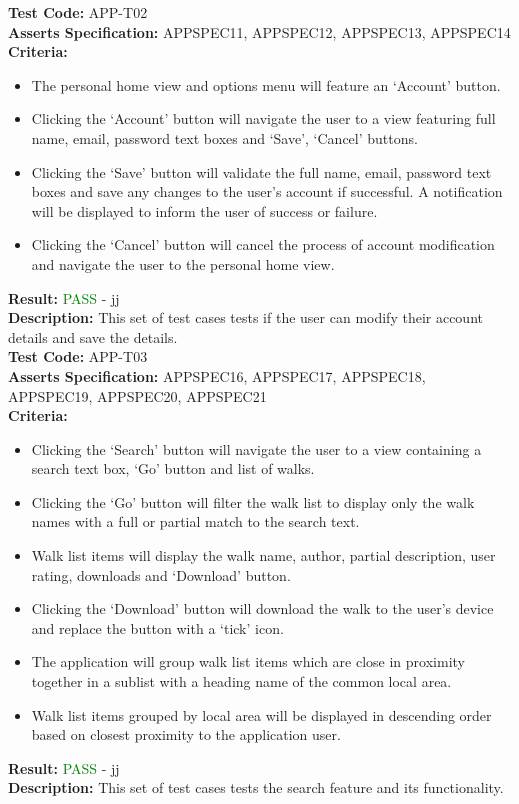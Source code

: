 \documentclass[11pt,a4paper]{report}
\begin{document}
\label{test:APP-T02}
\noindent\textbf{Test Code:} APP-T02\\
\textbf{Asserts Specification:} APPSPEC11, APPSPEC12, APPSPEC13, APPSPEC14\\ 
\textbf{Criteria:} \begin{itemize}
                     \item The personal home view and options menu will feature an `Account' button.
                     \item Clicking the `Account' button will navigate the user to a view featuring full name, email, password text boxes and `Save', `Cancel' buttons.
                     \item Clicking the `Save' button will validate the full name, email, password text boxes and save any changes to the user's account if successful. A notification will be displayed to inform the user of success or failure.
                     \item Clicking the `Cancel' button will cancel the process of account modification and navigate the user to the personal home view. 
                   \end{itemize}
\textbf{Result:} \textcolor{green}{PASS} - jj\\
\textbf{Description:} This set of test cases tests if the user can modify their account details and save the details.\\

\label{test:APP-T03}
\noindent\textbf{Test Code:} APP-T03\\
\textbf{Asserts Specification:} APPSPEC16, APPSPEC17, APPSPEC18, APPSPEC19, APPSPEC20, APPSPEC21\\ 
\textbf{Criteria:} \begin{itemize}
                     \item Clicking the `Search' button will navigate the user to a view containing a search text box, `Go' button and list of walks.
                     \item Clicking the `Go' button will filter the walk list to display only the walk names with a full or partial match to the search text.
                     \item Walk list items will display the walk name, author, partial description, user rating, downloads and `Download' button.
                     \item Clicking the `Download' button will download the walk to the user's device and replace the button with a `tick' icon.
                     \item The application will group walk list items which are close in proximity together in a sublist with a heading name of the common local area.
                     \item Walk list items grouped by local area will be displayed in descending order based on closest proximity to the application user.
                   \end{itemize}
\textbf{Result:} \textcolor{green}{PASS} - jj\\
\textbf{Description:} This set of test cases tests the search feature and its functionality. \\
\end{document}
